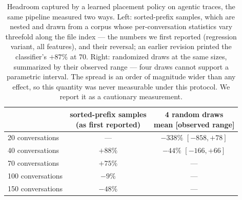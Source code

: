 \begin{table}[t]
  \centering \small \setlength{\tabcolsep}{5pt}
  \begin{tabular}{@{}lcc@{}}
    \toprule
    & \makecell{sorted-prefix samples\\(as first reported)} & \makecell{4 random draws\\mean [observed range]} \\
    \midrule
    20 conversations & --- & $-338\%$ $[-858, +78]$ \\
    40 conversations & $+88\%$ & $-44\%$ $[-166, +66]$ \\
    70 conversations & $+75\%$ & --- \\
    100 conversations & $-9\%$ & --- \\
    150 conversations & $-48\%$ & --- \\
    \bottomrule
  \end{tabular}
  \caption{Headroom captured by a learned placement policy on agentic traces, the same pipeline measured
  two ways. Left: sorted-prefix samples, which are nested and drawn from a corpus whose per-conversation
  statistics vary threefold along the file index --- the numbers we first reported (regression variant,
  all features), and their reversal; an earlier revision printed the classifier's $+87\%$ at 70.
  Right: randomized draws at the same sizes, summarized by their observed range --- four draws cannot
  support a parametric interval. The spread is an order of magnitude wider than any effect, so this
  quantity was never measurable under this protocol. We report it as a cautionary measurement.}
  \label{tab:kvct}
\end{table}
